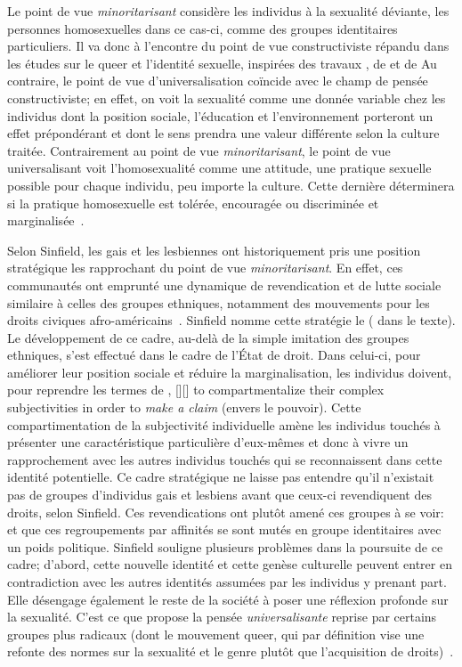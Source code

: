 Le point de vue \emph{minoritarisant} considère les individus à la sexualité déviante, les personnes homosexuelles dans ce cas-ci, comme des groupes identitaires particuliers.
Il va donc à l'encontre du point de vue constructiviste répandu dans les études sur le queer et l'identité sexuelle, inspirées des travaux \citet{Foucault2011}, de \citet{Rubin2010} et de \citet{Butler2007}
Au contraire, le point de vue d'universalisation coïncide avec le champ de pensée constructiviste; en effet, on voit la sexualité comme une donnée variable chez les individus dont la position sociale, l'éducation et l'environnement porteront un effet prépondérant et dont le sens prendra une valeur différente selon la culture traitée.
Contrairement au point de vue \emph{minoritarisant}, le point de vue universalisant voit l'homosexualité comme une attitude, une pratique sexuelle possible pour chaque individu, peu importe la culture.
Cette dernière déterminera si la pratique homosexuelle est tolérée, encouragée ou discriminée et marginalisée~\citep[271]{Sinfield1996}.

Selon Sinfield, les gais et les lesbiennes ont historiquement pris une position stratégique les rapprochant du point de vue \emph{minoritarisant}.
En effet, ces communautés ont emprunté une dynamique de revendication et de lutte sociale similaire à celles des groupes ethniques, notamment des mouvements pour les droits civiques afro-américains~\citep[271]{Sinfield1996}.
Sinfield nomme cette stratégie le  ( dans le texte).
Le développement de ce cadre, au-delà de la simple imitation des groupes ethniques, s'est effectué dans le cadre de l'État de droit.
Dans celui-ci, pour améliorer leur position sociale et réduire la marginalisation, les individus doivent, pour reprendre les termes de \citet{Sinfield1996}, [{\citeyear[272]{Sinfield1996}}][]{\textelp{} to  compartmentalize their complex subjectivities in order to \emph{make a claim} (envers le pouvoir)}.
Cette compartimentation de la subjectivité individuelle amène les individus touchés à présenter une caractéristique particulière d'eux-mêmes et donc à vivre un rapprochement avec les autres individus touchés qui se reconnaissent dans cette identité potentielle.
Ce cadre stratégique ne laisse pas entendre qu'il n'existait pas de groupes d'individus gais et lesbiens avant que ceux-ci revendiquent des droits, selon Sinfield.
Ces revendications ont plutôt amené ces groupes à se voir: ~\citep[272]{Sinfield1996} et que ces regroupements par affinités se sont mutés en groupe identitaires avec un poids politique.
Sinfield souligne plusieurs problèmes dans la poursuite de ce cadre; d'abord, cette nouvelle identité et cette genèse culturelle peuvent entrer en contradiction avec les autres identités assumées par les individus y prenant part.
Elle désengage également le reste de la société à poser une réflexion profonde sur la sexualité.
C'est ce que propose la pensée \emph{universalisante} reprise par certains groupes plus radicaux (dont le mouvement queer, qui par définition vise une refonte des normes sur la sexualité et le genre plutôt que l'acquisition de droits)~\citep[273]{Sinfield1996}.

